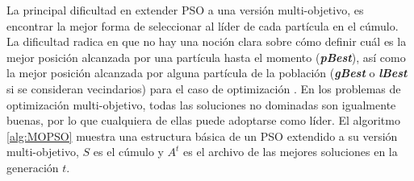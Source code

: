   La principal dificultad en extender PSO a una versi\'on multi-objetivo, es encontrar la mejor forma de seleccionar 
  al l\'ider de cada part\'icula en el c\'umulo. La dificultad radica en que no hay una noci\'on clara sobre c\'omo definir
  cu\'al es la mejor posici\'on alcanzada por una part\'icula hasta el momento (\textbf{\textit{pBest}}), as\'i como la mejor 
  posici\'on alcanzada por alguna part\'icula de la poblaci\'on (\textbf{\textit{gBest}} o \textbf{\textit{lBest}} si se consideran 
  vecindarios) para el caso de optimizaci\'on \DIFdelbegin {}\DIFdelend \DIFaddbegin {}\DIFaddend . En los problemas de optimizaci\'on multi-objetivo, todas las soluciones 
  no dominadas son igualmente buenas, por lo que cualquiera de ellas puede adoptarse como l\'ider.  El algoritmo \ref{alg:MOPSO} 
  muestra una estructura b\'asica de un PSO extendido a su versi\'on multi-objetivo, $S$ es el c\'umulo y $A^t$ es el archivo de las 
  mejores soluciones en la generaci\'on $t$.

